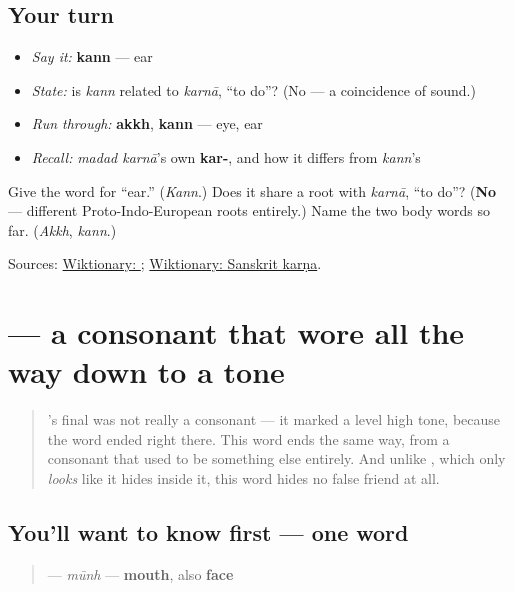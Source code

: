 \subsection*{Your turn}
\begin{itemize}
\raggedright
  \item \emph{Say it:} \textbf{kann} — ear
  \item \emph{State:} is \emph{kann} related to \emph{karnā}, \textquotedblleft{}to do\textquotedblright{}? (No — a coincidence of sound.)
  \item \emph{Run through:} \textbf{akkh}, \textbf{kann} — eye, ear
  \item \emph{Recall:} \emph{madad karnā}'s own \textbf{kar-}, and how it differs from \emph{kann}'s
\end{itemize}

\begin{tcolorbox}[breakable,colback=teal!4,colframe=teal!35!black,title={Before you move on}]
Give the word for \textquotedblleft{}ear.\textquotedblright{} (\emph{Kann}.) Does it share a root with \emph{karnā}, \textquotedblleft{}to do\textquotedblright{}? (\textbf{No} — different Proto-Indo-European roots entirely.) Name the two body words so far. (\emph{Akkh}, \emph{kann}.)

Sources: \href{https://en.wiktionary.org/wiki/\%E0\%A8\%95\%E0\%A9\%B0\%E0\%A8\%A8}{Wiktionary: }; \href{https://en.wiktionary.org/wiki/\%E0\%A4\%95\%E0\%A4\%B0\%E0\%A5\%8D\%E0\%A4\%A3}{Wiktionary: Sanskrit karṇa}.
\end{tcolorbox}
\section[\texorpdfstring{\pa{ਮੂੰਹ} (mūnh)}{ਮੂੰਹ (mūnh)}]{ — a consonant that wore all the way down to a tone}

\label{lesson:PA-C12-munh}



\begin{quote}
\textbf{}'s final \textbf{} was not really a consonant — it marked a level high tone, because the word ended right there. This word ends the same way, from a consonant that used to be something else entirely. And unlike \textbf{}, which only \emph{looks} like it hides \textbf{} inside it, this word hides no false friend at all.
\end{quote}

\subsection*{You'll want to know first — one word}
\begin{quote}
\textbf{} — \emph{mūnh} — \textbf{mouth}, also \textbf{face}
\end{quote}

